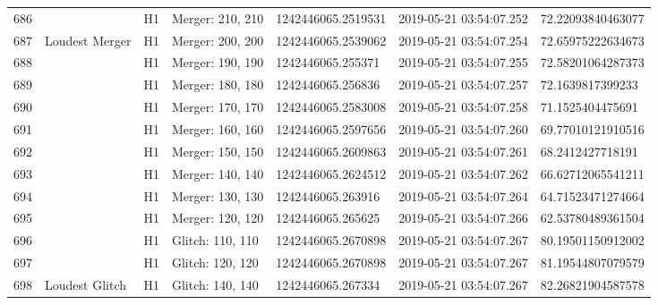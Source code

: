 \begin{longtable}{lllllll}
686  &                                                    &       H1 &  Merger: 210, 210 &  1242446065.2519531 &  2019-05-21 03:54:07.252 &   72.22093840463077 \\
687  &                                     Loudest Merger &       H1 &  Merger: 200, 200 &  1242446065.2539062 &  2019-05-21 03:54:07.254 &   72.65975222634673 \\
688  &                                                    &       H1 &  Merger: 190, 190 &   1242446065.255371 &  2019-05-21 03:54:07.255 &   72.58201064287373 \\
689  &                                                    &       H1 &  Merger: 180, 180 &   1242446065.256836 &  2019-05-21 03:54:07.257 &    72.1639817399233 \\
690  &                                                    &       H1 &  Merger: 170, 170 &  1242446065.2583008 &  2019-05-21 03:54:07.258 &    71.1525404475691 \\
691  &                                                    &       H1 &  Merger: 160, 160 &  1242446065.2597656 &  2019-05-21 03:54:07.260 &   69.77010121910516 \\
692  &                                                    &       H1 &  Merger: 150, 150 &  1242446065.2609863 &  2019-05-21 03:54:07.261 &    68.2412427718191 \\
693  &                                                    &       H1 &  Merger: 140, 140 &  1242446065.2624512 &  2019-05-21 03:54:07.262 &   66.62712065541211 \\
694  &                                                    &       H1 &  Merger: 130, 130 &   1242446065.263916 &  2019-05-21 03:54:07.264 &   64.71523471274664 \\
695  &                                                    &       H1 &  Merger: 120, 120 &   1242446065.265625 &  2019-05-21 03:54:07.266 &   62.53780489361504 \\
696  &                                                    &       H1 &  Glitch: 110, 110 &  1242446065.2670898 &  2019-05-21 03:54:07.267 &   80.19501150912002 \\
697  &                                                    &       H1 &  Glitch: 120, 120 &  1242446065.2670898 &  2019-05-21 03:54:07.267 &   81.19544807079579 \\
698  &                                     Loudest Glitch &       H1 &  Glitch: 140, 140 &   1242446065.267334 &  2019-05-21 03:54:07.267 &   82.26821904587578 \\

\end{longtable}
